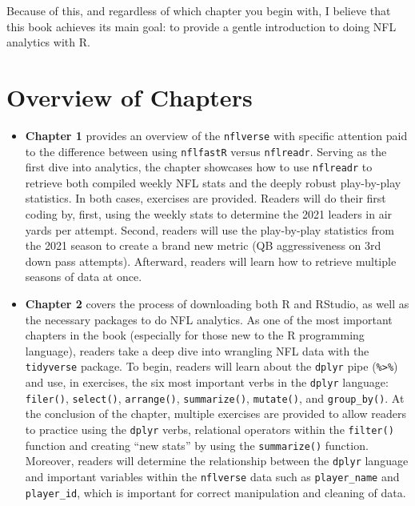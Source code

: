 \documentclass[
  letterpaper,
]{krantz}
\begin{document}
Because of this, and regardless of which chapter you begin with, I
believe that this book achieves its main goal: to provide a gentle
introduction to doing NFL analytics with R.

\hypertarget{overview-of-chapters}{%
\section{Overview of Chapters}\label{overview-of-chapters}}

\begin{itemize}
\item
  \textbf{Chapter 1} provides an overview of the \texttt{nflverse} with
  specific attention paid to the difference between using
  \texttt{nflfastR} versus \texttt{nflreadr}. Serving as the first dive
  into analytics, the chapter showcases how to use \texttt{nflreadr} to
  retrieve both compiled weekly NFL stats and the deeply robust
  play-by-play statistics. In both cases, exercises are provided.
  Readers will do their first coding by, first, using the weekly stats
  to determine the 2021 leaders in air yards per attempt. Second,
  readers will use the play-by-play statistics from the 2021 season to
  create a brand new metric (QB aggressiveness on 3rd down pass
  attempts). Afterward, readers will learn how to retrieve multiple
  seasons of data at once.
\item
  \textbf{Chapter 2} covers the process of downloading both R and
  RStudio, as well as the necessary packages to do NFL analytics. As one
  of the most important chapters in the book (especially for those new
  to the R programming language), readers take a deep dive into
  wrangling NFL data with the \texttt{tidyverse} package. To begin,
  readers will learn about the \texttt{dplyr} pipe
  (\texttt{\%\textgreater{}\%}) and use, in exercises, the six most
  important verbs in the \texttt{dplyr} language: \texttt{filer()},
  \texttt{select()}, \texttt{arrange()}, \texttt{summarize()},
  \texttt{mutate()}, and \texttt{group\_by()}. At the conclusion of the
  chapter, multiple exercises are provided to allow readers to practice
  using the \texttt{dplyr} verbs, relational operators within the
  \texttt{filter()} function and creating ``new stats'' by using the
  \texttt{summarize()} function. Moreover, readers will determine the
  relationship between the \texttt{dplyr} language and important
  variables within the \texttt{nflverse} data such as
  \texttt{player\_name} and \texttt{player\_id}, which is important for
  correct manipulation and cleaning of data.

\end{itemize}
\end{document}
